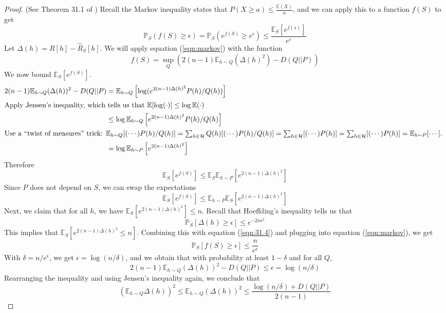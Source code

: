 \documentclass{article}
\begin{document}
\begin{proof}
(See Theorem 31.1 of \cite{Shalev2014})
Recall the Markov inequality states that $P(X\geq a) \leq \frac{\mathbb{E}(X)}{a}$, and we can apply this to a function $f(S)$ to get
\begin{equation}
\mathbb{P}_S(f(S)\geq \epsilon) = \mathbb{P}_S(e^{f(S)} \geq e^\epsilon) \leq \frac{\mathbb{E}_S[e^{f(s)}]}{e^\epsilon}
\label{eqn:markov}
\end{equation}
Let $\Delta(h) = R[h] - \hat R_S[h]$.
We will apply equation (\ref{eqn:markov}) with the function
\[f(S) = \sup_Q \left(2(n-1)\mathbb{E}_{h\sim Q}(\Delta(h)^2) - D(Q||P)\right)\]
We now bound $\mathbb{E}_S[e^{f(S)}]$.
\begin{align*}
2(n-1)\mathbb{E}_{h\sim Q}(\Delta(h))^2 - D(Q||P)
&= \mathbb{E}_{h\sim Q} \left[\log(e^{2(n-1)\Delta(h)^2}P(h)/Q(h))\right]\\
\intertext{Apply Jensen's inequality, which tells us that $\mathbb{E}[\log(\cdot)]\leq \log\mathbb{E}(\cdot)$}
&\leq \log\mathbb{E}_{h\sim Q} \left[e^{2(n-1)\Delta(h)^2}P(h)/Q(h)\right]\\
\intertext{Use a ``twist of measures'' trick: $\mathbb{E}_{h\sim Q}[(\cdots) P(h)/Q(h)] = \sum_{h\in \mathcal{H}} Q(h)[(\cdots) P(h)/Q(h)] = \sum_{h\in \mathcal{H}}[(\cdots) P(h)] = \sum_{h\in \mathcal{H}}[(\cdots) P(h)] = \mathbb{E}_{h\sim P}[\cdots]$. }
&= \log\mathbb{E}_{h\sim P} \left[e^{2(n-1)\Delta(h)^2}\right]
\end{align*}
Therefore
\[\mathbb{E}_S[e^{f(S)}] \leq \mathbb{E}_S\mathbb{E}_{h\sim P}[e^{2(n-1)\Delta(h)^2}]\]
Since $P$ does not depend on $S$, we can swap the expectations
\begin{equation}
\mathbb{E}_S[e^{f(S)}] \leq \mathbb{E}_{h\sim P}\mathbb{E}_S[e^{2(n-1)\Delta(h)^2}]
\label{eqn:31.4}
\end{equation}
Next, we claim that for all $h$, we have $\mathbb{E}_S[e^{2(n-1)\Delta(h)^2}] \leq n$.
Recall that Hoeffding's inequality tells us that
\[\mathbb{P}_S[\Delta(h) \geq \epsilon] \leq e^{-2n\epsilon^2}\]
This implies that $\mathbb{E}_S[e^{2(n-1)\Delta(h)^2} \leq n]$.
Combining this with equation (\ref{eqn:31.4}) and plugging into equation (\ref{eqn:markov}), we get
\[\mathbb{P}_S[f(S) \geq \epsilon] \leq \frac{n}{e^\epsilon}\]
With $\delta=n/e^\epsilon$, we get $\epsilon=\log(n/\delta)$, and we obtain that with probability at least $1-\delta$ and for all $Q$,
\[2(n-1)\mathbb{E}_{h\sim Q} (\Delta(h))^2 - D(Q||P) \leq \epsilon = \log(n/\delta)\]
Rearranging the inequality and using Jensen's inequality again, we conclude that
\[\left(\mathbb{E}_{h\sim Q}\Delta(h)\right)^2 \leq \mathbb{E}_{h\sim Q}(\Delta(h))^2 \leq \frac{\log(n/\delta) + D(Q||P)}{2(n-1)}\]
\end{proof}
\end{document}
